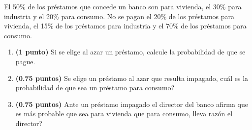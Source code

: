 
El 50\% de los préstamos que concede un banco son para vivienda, el 30\% para industria y el 20\% para consumo. No se pagan el 20\% de los préstamos para vivienda, el 15\% de los préstamos para industria y el 70\% de los préstamos para consumo.
\begin{enumerate}[label=\alph*)]
\item \textbf{(1 punto)} Si se elige al azar un préstamo, calcule la probabilidad de que se pague.
\item \textbf{(0.75 puntos)} Se elige un préstamo al azar que resulta impagado, \textquestiondown{}cuál es la probabilidad de que sea un préstamo para consumo?
\item \textbf{(0.75 puntos)} Ante un préstamo impagado el director del banco afirma que es más probable que sea para vivienda que para consumo, \textquestiondown{}lleva razón el director?
\end{enumerate}
